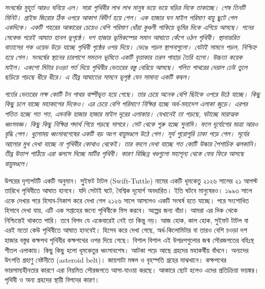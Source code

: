 \documentclass[
]{book}
\begin{document}
\emph{সংঘর্ষের মুহূর্ত আরও ঘনিয়ে এল। সারা পৃথিবীর লাখ লাখ মানুষ ভয়ে ভয়ে ঘড়ির দিকে তাকাচ্ছে। শেষ তিনটি মিনিট।
গ্রাইন্ড জিরোর ঠিক ওপরে আকাশ বিদীর্ণ হয়ে গেল। এক হাজার ঘন মাইল পরিমাণ বায়ু ছুটে গেল একদিকে। একটি শহরের আকারের চেয়েও বেশি পরিমাণ ধোঁয়া কুণ্ডলী পাকিয়ে ভূমির দিকে এগিয়ে আসছে। পনের সেকেন্ড পরেই আঘাত হানল ভূপৃষ্ঠে। দশ হাজার ভূমিকম্পের সমান আঘাতে কেঁপে ওঠল পৃথিবী। স্থানান্তরিত বাতাসের শক ওয়েভ উড়ে যাচ্ছে পৃথিবী পৃষ্ঠের ওপর দিয়ে। ভেঙে পড়ল স্থাপনাগুলো। যেটাই সামনে পড়ল, নিশ্চিহ্ন হয়ে গেল। সংঘর্ষের স্থানের চারপাশে সমতল ভূমিতে একটি বৃত্তাকার তরল পাহাড় তৈরি হলো। উচ্চতা কয়েক মাইল। একশো মিটার চওড়া গর্ত দিয়ে পৃথিবীর ভেতরের বস্তু বেরিয়ে আসছে। গলিত পাথরের দেয়াল ঢেউ তুলে ছড়িয়ে পড়ছে ধীরে ধীরে। এ তীব্র আঘাতের সামনে ভূপৃষ্ঠ যেন সামান্য একটি কম্বল।}

\emph{গর্তের ভেতরের লক্ষ কোটি টন পাথর বাষ্পীভূত হয়ে গেছে। তার চেয়ে অনেক বেশি ছিটকে ওপরে উঠে যাচ্ছে। কিছু কিছু চলে যাচ্ছে মহাকাশের দিকেও। এর চেয়ে বেশি পরিমাণে নিক্ষিপ্ত হচ্ছে অর্ধ-মহাদেশ এলাকা জুড়ে। এরপর পতিত হচ্ছে শত শত, এমনকি হাজার হাজার মাইল দূরের এলাকায়। যেখানেই তা পড়ছে, ঘটাচ্ছে মারাত্মক ধ্বংসযজ্ঞ। কিছু কিছু নিক্ষিপ্ত পদার্থ গিয়ে পড়ছে সাগরে। সেট থেকে শুরু হচ্ছে সুনামি। ফলে দূর্যোগের মাত্রা আরও বৃদ্ধি পেল। ধুলোময় ধ্বংসাবশেষের একটি বড় অংশ বায়ুমণ্ডলে উঠে গেল। সূর্য পুরোপুরি ঢাকা পড়ে গেল। সূর্যের আলোর মুখ দেখা যাচ্ছে না পৃথিবীর কোথাও থেকেই। তার বদলে দেখা যাচ্ছে শত কোটি উল্কার পৈশাচিক ঝলকানি। তীব্র উত্তাপ পাঠিয়ে এরা ঝলসে দিচ্ছে মাটির পৃথিবী। কারণ বিচ্ছিন্ন খণ্ডগুলো মহাশূন্য থেকে ফের ফিরে আসছে বায়ুমণ্ডলে।}

উপরের দৃশ্যপটটি একটি অনুমান। সু্ইফট টাটল (Swift-Tuttle) নামের একটি ধূমকেতু ২১২৬ সালের ২১ আগস্ট তারিখে পৃথিবীতে আঘাত হানবে। যদি সেটাই ঘটে, বৈশ্বিক দূযোর্গ অবধারিত। ইতি ঘটবে মানুষেরও। ১৯৯৩ সালে একে দেখার পরে হিসাব-নিকাশ করে দেখা গেল ২১২৬ সালে আসলেও একটি সংঘর্ষ হতে যাচ্ছে। পরে সংশোধিত হিসাবে দেখা যায়, এটি এক সপ্তাহের জন্যে পৃথিবীকে মিস করবে। অল্পের জন্য বাঁচা। আমরা এর দিক থেকে নিশ্চিন্তেই থাকতে পারি। তবে বিপদ যে একেবারেই নেই তা কিন্তু নয়। আজ হোক, কাল হোক, সুইফট টাটল বা এরই মতো কেউ পৃথিবীতে আঘাত হানবেই। হিসেব করে দেখা গেছে, অর্ধ-কিলোমিটার বা তারও বেশি চওড়া দশ হাজার বস্তুর কক্ষপথ পৃথিবীর কক্ষপথের ওপর দিয়ে গেছে। বিশাল বিশাল এই উপদ্রপগুলোর জন্ম সৌরজগতের বহিঃস্থ শীতল এলাকায়। কিছু কিছু হলো ধূমকেতুর ধ্বংসাবশেষ। আটকা পড়ে আছে গ্রহদের মহাকর্ষীয় বাঁধনে। অন্যদের উৎপত্তি গ্রহাণু বেষ্টনীতে (asteroid belt)। জায়গাটা মঙ্গল ও বৃহস্পতি গ্রহের মাঝখানে। কক্ষপথের ভারসাম্যহীনতার কারণে এরা নিয়মিত সৌরজগতে আসা-যাওয়া করছে। আকারে ছোট হলেও এদের প্রতিক্রিয়া ভয়ঙ্কর। পৃথিবী ও অন্য গ্রহদের স্থায়ী বিপদের কারণ।
\end{document}
